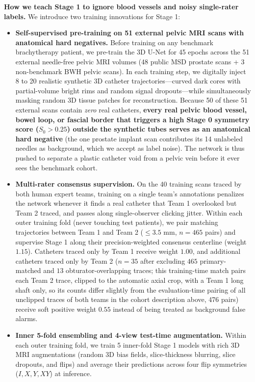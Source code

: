 \documentclass[
  11pt,
]{article}
\providecommand{\tightlist}{%
  \setlength{\itemsep}{0pt}\setlength{\parskip}{0pt}}
\begin{document}
\textbf{How we teach Stage 1 to ignore blood vessels and noisy
single-rater labels.} We introduce two training innovations for Stage 1:

\begin{itemize}
\tightlist
\item
  \textbf{Self-supervised pre-training on 51 external pelvic MRI scans
  with anatomical hard negatives.} Before training on any benchmark
  brachytherapy patient, we pre-train the 3D U-Net for 45 epochs across
  the 51 external needle-free pelvic MRI volumes (48 public MSD prostate
  scans + 3 non-benchmark BWH pelvic scans). In each training step, we
  digitally inject 8 to 20 realistic synthetic 3D catheter
  trajectories---curved dark cores with partial-volume bright rims and
  random signal dropouts---while simultaneously masking random 3D tissue
  patches for reconstruction. Because 50 of these 51 external scans
  contain \emph{zero} real catheters, \textbf{every real pelvic blood
  vessel, bowel loop, or fascial border that triggers a high Stage 0
  symmetry score (\(S_0 > 0.25\)) outside the synthetic tubes serves as
  an anatomical hard negative} (the one prostate implant scan
  contributes its 14 unlabeled needles as background, which we accept as
  label noise). The network is thus pushed to separate a plastic
  catheter void from a pelvic vein before it ever sees the benchmark
  cohort.
\item
  \textbf{Multi-rater consensus supervision.} On the 40 training scans
  traced by both human expert teams, training on a single team's
  annotations penalizes the network whenever it finds a real catheter
  that Team 1 overlooked but Team 2 traced, and passes along
  single-observer clicking jitter. Within each outer training fold
  (never touching test patients), we pair matching trajectories between
  Team 1 and Team 2 (\(\le 3.5\text{ mm}\), \(n = 465\) pairs) and
  supervise Stage 1 along their precision-weighted consensus centerline
  (weight \(1.15\)). Catheters traced only by Team 1 receive weight
  \(1.00\), and additional catheters traced only by Team 2 (\(n = 35\)
  after excluding \(465\) primary-matched and \(13\)
  obturator-overlapping traces; this training-time match pairs each Team
  2 trace, clipped to the automatic axial crop, with a Team 1 long shaft
  only, so its counts differ slightly from the evaluation-time pairing
  of all unclipped traces of both teams in the cohort description above,
  476 pairs) receive soft positive weight \(0.55\) instead of being
  treated as background false alarms.
\item
  \textbf{Inner 5-fold ensembling and 4-view test-time augmentation.}
  Within each outer training fold, we train 5 inner-fold Stage 1 models
  with rich 3D MRI augmentations (random 3D bias fields, slice-thickness
  blurring, slice dropouts, and flips) and average their predictions
  across four flip symmetries (\(I, X, Y, XY\)) at inference.
\end{itemize}
\end{document}
